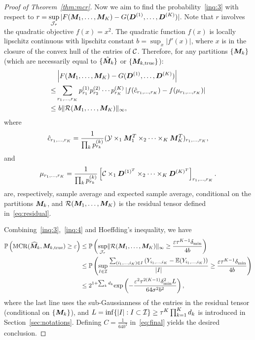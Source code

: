 \documentclass{article}
\DeclareMathOperator*{\mcr}{MCR}
\begin{document}
\begin{appendices}
\begin{proof}[Proof of Theorem~\ref{thm:mcr}]
{%
Now we aim to find the probability~\eqref{inq:3} with respect to $r=\displaystyle\sup_{\mathcal{J}_\tau} |F(\bm M_1,\ldots,\bm M_K)-G(\bm{D}^{(1)},\ldots,\bm{D}^{(K)})|$. Note that $r$ involves the quadratic objective $f(x)=x^2$. The quadratic function $f(x)$ is locally lipschitz continuous with lipschitz constant $b = \sup_x|f'(x)|$, where $x$ is in the closure of the convex hull of the entries of $\mathcal{C}$. Therefore, for any partitions $\{\bm M_k\}$ (which are necessarily equal to $\{\hat {\bm M}_k\}$ or $\{\bm M_{k,\text{true}}\}$):
\begin{align}\label{inq:4}
&\left|F(\bm M_1,\ldots,\bm M_K)-G(\bm{D}^{(1)}, \ldots,\bm{D}^{(K)})\right|\notag \\
\leq&\sum_{r_1,\ldots,r_K}p_{r_1}^{(1)}p_{r_2}^{(2)}\cdots p_{r_K}^{(K)}\left|f(\hat c_{r_1,\ldots,r_K})-f(\mu_{r_1,\ldots,r_K})\right|\notag \\
\leq& \ b\lVert\mathcal{R}(\bm M_1,\ldots,\bm M_K)\rVert_\infty,
\end{align}
where 
\[
\hat c_{r_1,\ldots,r_K}={1\over \prod_k p^{(k)}_{r_k}}  (\mathcal{Y}\times_1 \bm M^T_1\times_2\cdots\times_K\bm M^T_K)_{r_1,\ldots,r_K},
\]
and
\[
\mu_{r_1,\ldots,r_K}={1\over \prod_k  p^{(k)}_{r_k}}\left[ \mathcal{C}\times_1 \bm{D}^{(1)^T} \times_2\cdots\times_K \bm{D}^{(K)^T}\right]_{r_1,\ldots,r_K}.
\]
are, respectively, sample average and expected sample average, conditional on the partitions ${\bm M_k}$, and $\mathcal{R}( \bm M_1,\ldots,\bm M_K)$ is the residual tensor defined in~\eqref{eq:residual}. 

Combining~\eqref{inq:3},~\eqref{inq:4} and Hoeffding's inequality, we have
\begin{align}\label{eq:final}
\mathbb{P}\left(\mcr(\widehat{\mM}_k, \mM_{k,\text{true}}) \geq \varepsilon\right)
&\leq \mathbb{P}\left(\sup_{\tJ_\tau}\mnormSize{}{\tR(\mM_1,\ldots,\mM_K)} \geq {\varepsilon \tau^{K-1}\delta_{\min} \over 4 b}\right)\notag\notag \\
&\leq \mathbb{P}\left(  \sup_{I\in\tI} {\sum_{(i_1,\ldots,i_K)\in I}\left(Y_{i_1,\ldots,i_K}-\mathbb{E}(Y_{i_1,\ldots,i_K})\right)\over |I|}\geq   {\varepsilon \tau^{K-1}\delta_{\min} \over 4 b} \right)\notag \\
&\leq 2^{1+\sum_k d_k}\text{exp}\left( -\frac{\varepsilon^2\tau^{2(K-1)}\delta_{\min}^2L}{64\sigma^2b^2} \right),
\end{align}
where the last line uses the sub-Gaussianness of the entries in the residual tensor (conditional on $\{\bm M_k\}$), and $L=\inf\{|I|: I\subset \mathcal{I}\} \geq \tau^K\prod_{k=1}^Kd_k$ is introduced in Section~\ref{sec:notations}.
Defining $C=\frac{1}{64b^2}$ in~\eqref{eq:final} yields the desired conclusion.


}
\end{proof}
\end{appendices}
\end{document}
